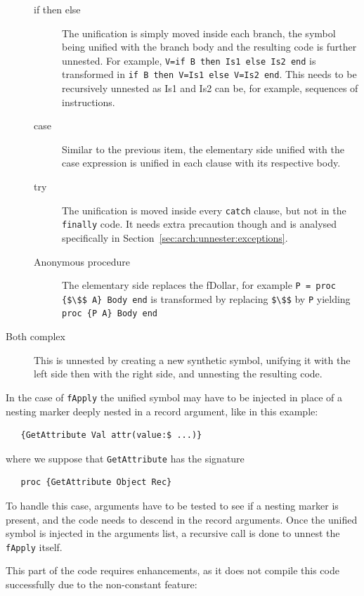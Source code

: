 \documentclass[a4paper]{memoir}
\begin{document}
\begin{description}
\begin{description}
      \item[if then else] The unification is simply moved inside each branch,
        the symbol being unified with the branch body and the resulting code is further unnested. For example, \lstinline!V=if B then Is1 else Is2 end! is transformed in \lstinline!if B then V=Is1 else V=Is2 end!. This needs to be recursively unnested as Is1 and Is2 can be, for example,  sequences of instructions.
      \item[case] Similar to the previous item, the elementary side  unified with the case expression is unified in each
        clause with its respective body.
      \item[try] The unification is moved inside every \lstinline!catch! clause, but not in
        the \lstinline!finally! code. It needs extra precaution though and is analysed specifically in
        Section~\ref{sec:arch:unnester:exceptions}.
      \item[Anonymous procedure] The elementary side replaces the fDollar, for
        example
        \lstinline[mathescape]!P = proc {$\$$ A} Body end! is transformed by replacing \lstinline[mathescape]{$\$$} by \lstinline!P! yielding
        \lstinline[mathescape]!proc {P A} Body end!
    \end{description}
  \item[Both complex] This is unnested by creating a new synthetic symbol, unifying it with the left side then with the right side, and unnesting the resulting code.
\end{description}

In the case of \lstinline!fApply! the unified
symbol may have to be injected in place of a nesting marker deeply nested in
a record argument, like in this example:

\begin{lstlisting}
   {GetAttribute Val attr(value:$ ...)}
\end{lstlisting}

where we suppose that \lstinline!GetAttribute! has the signature 
\begin{lstlisting}
   proc {GetAttribute Object Rec}
\end{lstlisting}
To handle this case, arguments have to be tested to see if a nesting marker is
present, and the code needs to descend in the record arguments.
Once the unified symbol is injected in the arguments list, a recursive call is
done to unnest the \lstinline!fApply! itself.

This part of the code requires enhancements, as it does not compile this code successfully due to the non-constant feature:
\end{document}
